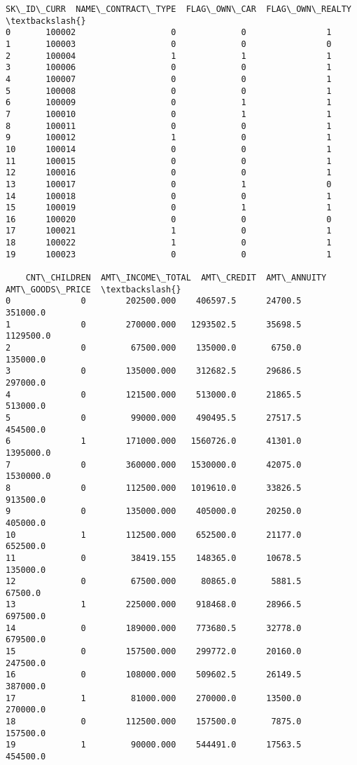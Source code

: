 \documentclass[11pt]{article}
\begin{document}
    \begin{Verbatim}[commandchars=\\\{\}]
    SK\_ID\_CURR  NAME\_CONTRACT\_TYPE  FLAG\_OWN\_CAR  FLAG\_OWN\_REALTY  \textbackslash{}
0       100002                   0             0                1   
1       100003                   0             0                0   
2       100004                   1             1                1   
3       100006                   0             0                1   
4       100007                   0             0                1   
5       100008                   0             0                1   
6       100009                   0             1                1   
7       100010                   0             1                1   
8       100011                   0             0                1   
9       100012                   1             0                1   
10      100014                   0             0                1   
11      100015                   0             0                1   
12      100016                   0             0                1   
13      100017                   0             1                0   
14      100018                   0             0                1   
15      100019                   0             1                1   
16      100020                   0             0                0   
17      100021                   1             0                1   
18      100022                   1             0                1   
19      100023                   0             0                1   

    CNT\_CHILDREN  AMT\_INCOME\_TOTAL  AMT\_CREDIT  AMT\_ANNUITY  AMT\_GOODS\_PRICE  \textbackslash{}
0              0        202500.000    406597.5      24700.5         351000.0   
1              0        270000.000   1293502.5      35698.5        1129500.0   
2              0         67500.000    135000.0       6750.0         135000.0   
3              0        135000.000    312682.5      29686.5         297000.0   
4              0        121500.000    513000.0      21865.5         513000.0   
5              0         99000.000    490495.5      27517.5         454500.0   
6              1        171000.000   1560726.0      41301.0        1395000.0   
7              0        360000.000   1530000.0      42075.0        1530000.0   
8              0        112500.000   1019610.0      33826.5         913500.0   
9              0        135000.000    405000.0      20250.0         405000.0   
10             1        112500.000    652500.0      21177.0         652500.0   
11             0         38419.155    148365.0      10678.5         135000.0   
12             0         67500.000     80865.0       5881.5          67500.0   
13             1        225000.000    918468.0      28966.5         697500.0   
14             0        189000.000    773680.5      32778.0         679500.0   
15             0        157500.000    299772.0      20160.0         247500.0   
16             0        108000.000    509602.5      26149.5         387000.0   
17             1         81000.000    270000.0      13500.0         270000.0   
18             0        112500.000    157500.0       7875.0         157500.0   
19             1         90000.000    544491.0      17563.5         454500.0   


\end{Verbatim}
\end{document}
